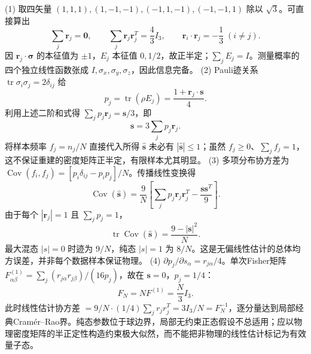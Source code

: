 (1) 取四矢量 \((1,1,1),(1,-1,-1),(-1,1,-1),(-1,-1,1)\) 除以 \(\sqrt3\)。可直接算出
\[
\sum_j\boldsymbol r_j=\mathbf0,\qquad
\sum_j\boldsymbol r_j\boldsymbol r_j^{T}=\frac43 I_3,\qquad
\boldsymbol r_i\cdot\boldsymbol r_j=-\frac13\;(i\ne j).
\]
因 \(\boldsymbol r_j\cdot\boldsymbol\sigma\) 的本征值为 \(\pm1\)，\(E_j\) 本征值 \(0,1/2\)，故正半定；\(\sum_jE_j=I\)。测量概率的四个独立线性函数张成 \(I,\sigma_x,\sigma_y,\sigma_z\)，因此信息完备。
(2) Pauli迹关系 \(\operatorname{tr}\sigma_i\sigma_j=2\delta_{ij}\) 给
\[
p_j=\operatorname{tr}(\rho E_j)=\frac{1+\boldsymbol r_j\cdot\boldsymbol s}{4}.
\]
利用上述二阶和式得 \(\sum_jp_j\boldsymbol r_j=\boldsymbol s/3\)，即
\[
\boxed{\boldsymbol s=3\sum_jp_j\boldsymbol r_j}.
\]
将样本频率 \(f_j=n_j/N\) 直接代入所得 \(\hat{\boldsymbol s}\) 未必有 \(|\hat{\boldsymbol s}|\le1\)；虽然 \(f_j\ge0\)、\(\sum_jf_j=1\)，这不保证重建的密度矩阵正半定，有限样本尤其明显。
(3) 多项分布协方差为 \(\operatorname{Cov}(f_i,f_j)=[p_i\delta_{ij}-p_ip_j]/N\)。传播线性变换得
\[
\boxed{\operatorname{Cov}(\hat{\boldsymbol s})=\frac9N\left[\sum_jp_j\boldsymbol r_j\boldsymbol r_j^T-\frac{\boldsymbol s\boldsymbol s^T}{9}\right]}.
\]
由于每个 \(|\boldsymbol r_j|=1\) 且 \(\sum_jp_j=1\)，
\[
\operatorname{tr}\operatorname{Cov}(\hat{\boldsymbol s})=\frac{9-|\boldsymbol s|^2}{N}.
\]
最大混态 \(|s|=0\) 时迹为 \(9/N\)，纯态 \(|s|=1\) 为 \(8/N\)。这是无偏线性估计的总体均方误差，并非每个数据样本保证物理。
(4) \(\partial p_j/\partial s_\alpha=r_{j\alpha}/4\)。单次Fisher矩阵 \(F_{\alpha\beta}^{(1)}=\sum_j(r_{j\alpha}r_{j\beta})/(16p_j)\)，故在 \(\boldsymbol s=0\)，\(p_j=1/4\)：
\[
\boxed{F_N=N F^{(1)}=\frac N3 I_3}.
\]
此时线性估计协方差 \(=9/N\cdot(1/4)\sum_jr_jr_j^T=3I_3/N=F_N^{-1}\)，逐分量达到局部经典Cramér–Rao界。纯态参数位于球边界，局部无约束正态假设不总适用；应以物理密度矩阵的半正定性构造约束极大似然，而不能把非物理的线性估计标记为有效量子态。
